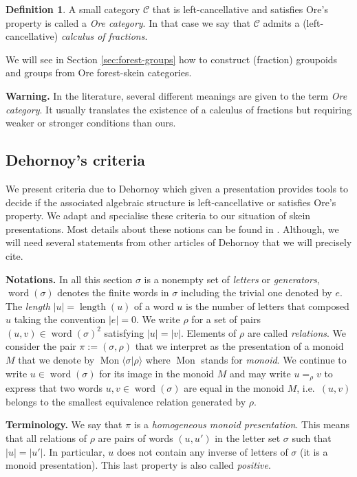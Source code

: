 \documentclass[a4paper, 12pt]{amsart}
\numberwithin{equation}{section}
\theoremstyle{definition}
\newtheorem{definition}[theorem]{Definition}
\newcommand{\cC}{\mathcal C}
\newcommand{\la}{\langle}
\DeclareMathOperator{\length}{length}
\DeclareMathOperator{\Mon}{Mon}
\newcommand{\ra}{\rangle}
\DeclareMathOperator{\word}{word}
\begin{document}
\begin{definition}
A small category $\cC$ that is left-cancellative and satisfies Ore's property is called a \textit{Ore category}.
In that case we say that $\cC$ admits a (left-cancellative) {\it calculus of fractions}.
\end{definition}

We will see in Section \ref{sec:forest-groups} how to construct (fraction) groupoids and groups from Ore forest-skein categories.

{\bf Warning.} In the literature, several different meanings are given to the term {\it Ore category}. It usually translates the existence of a calculus of fractions but requiring weaker or stronger conditions than ours.

\subsection{Dehornoy's criteria}

We present criteria due to Dehornoy which given a presentation provides tools to decide if the associated algebraic structure is left-cancellative or satisfies Ore's property.
We adapt and specialise these criteria to our situation of skein presentations.
Most details about these notions can be found in \cite{Dehornoy03}. Although, we will need several statements from other articles of Dehornoy that we will precisely cite.

{\bf Notations.} In all this section $\sigma$ is a nonempty set of \textit{letters} or \textit{generators}, $\word(\sigma)$ denotes the finite words in $\sigma$ including the trivial one denoted by $e$.
The \textit{length} $|u|=\length(u)$ of a word $u$ is the number of letters that composed $u$ taking the convention $|e|=0.$
We write $\rho$ for a set of pairs $(u,v)\in \word(\sigma)^2$ satisfying $|u|=|v|$.
Elements of $\rho$ are called \textit{relations}.
We consider the pair $\pi:=(\sigma,\rho)$ that we interpret as the presentation of a monoid $M$ that we denote by $\Mon\la \sigma|\rho\ra$ where $\Mon$ stands for {\it monoid}.
We continue to write $u\in\word(\sigma)$ for its image in the monoid $M$ and may write $u=_\rho v$ to express that two words $u,v\in \word(\sigma)$ are equal in the monoid $M$, i.e.~$(u,v)$ belongs to the smallest equivalence relation generated by $\rho.$

{\bf Terminology.}
We say that $\pi$ is a {\it homogeneous monoid presentation}. 
This means that all relations of $\rho$ are pairs of words $(u,u')$ in the letter set $\sigma$ such that $|u|=|u'|$. 
In particular, $u$ does not contain any inverse of letters of $\sigma$ (it is a monoid presentation). 
This last property is also called {\it positive}.
\end{document}
